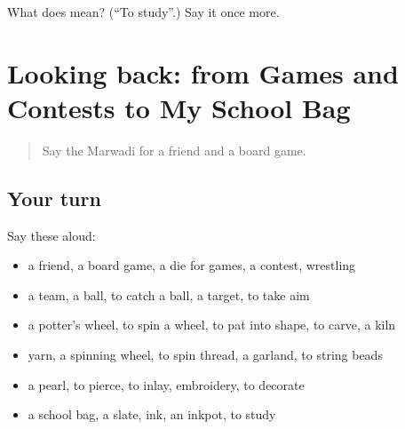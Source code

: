 \begin{tcolorbox}[breakable,colback=teal!4,colframe=teal!35!black,title={Before you move on}]
What does  mean? (\textquotedblleft{}To study\textquotedblright{}.) Say it once more.
\end{tcolorbox}
\section[(dialogue)]{Looking back: from Games and Contests to My School Bag}

\label{lesson:MW-R284-review-279-284}



\begin{quote}
Say the Marwadi for a friend and a board game.
\end{quote}

\subsection*{Your turn}
Say these aloud:

\begin{itemize}
\raggedright
  \item a friend, a board game, a die for games, a contest, wrestling
  \item a team, a ball, to catch a ball, a target, to take aim
  \item a potter's wheel, to spin a wheel, to pat into shape, to carve, a kiln
  \item yarn, a spinning wheel, to spin thread, a garland, to string beads
  \item a pearl, to pierce, to inlay, embroidery, to decorate
  \item a school bag, a slate, ink, an inkpot, to study
\end{itemize}

